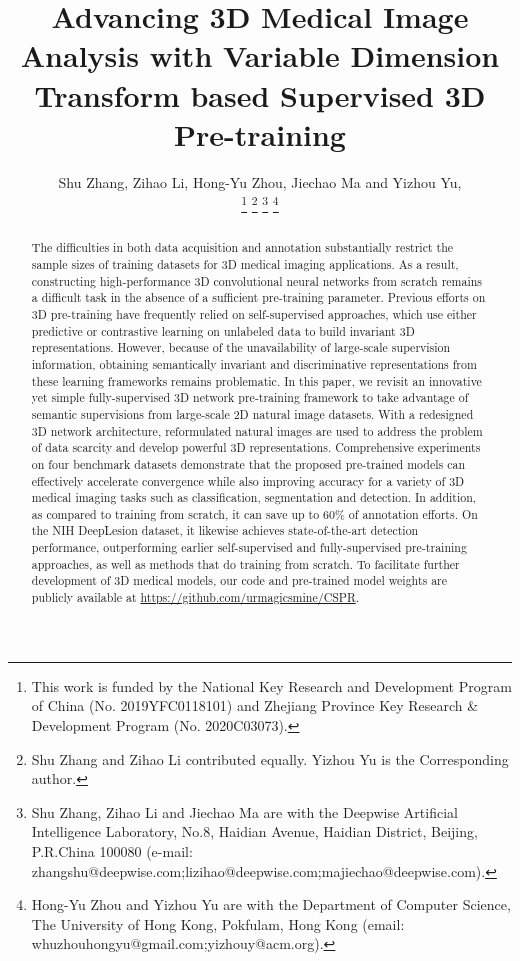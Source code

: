 \documentclass[journal,twoside,web]{ieeecolor}
\begin{document}
\title{Advancing 3D Medical Image Analysis with Variable Dimension Transform based Supervised 3D Pre-training}
\author{Shu Zhang, Zihao Li, Hong-Yu Zhou, Jiechao Ma and Yizhou Yu, \\
\thanks{This work is funded by the National Key Research and Development Program of China (No. 2019YFC0118101) and Zhejiang Province Key Research \& Development Program (No. 2020C03073).}
\thanks{Shu Zhang and Zihao Li contributed equally. Yizhou Yu is the Corresponding author.}
\thanks{Shu Zhang, Zihao Li and Jiechao Ma are with the Deepwise Artificial Intelligence Laboratory, No.8, Haidian Avenue, Haidian District, Beijing, P.R.China 100080 (e-mail: zhangshu@deepwise.com;lizihao@deepwise.com;majiechao@deepwise.com).}
\thanks{Hong-Yu Zhou and Yizhou Yu are with the Department of Computer Science, The University of Hong Kong, Pokfulam, Hong Kong (email: whuzhouhongyu@gmail.com;yizhouy@acm.org).}}


\maketitle

\begin{abstract}
The difficulties in both data acquisition and annotation substantially restrict the sample sizes of training datasets for 3D medical imaging applications. As a result, constructing high-performance 3D convolutional neural networks from scratch remains a difficult task in the absence of a sufficient pre-training parameter. Previous efforts on 3D pre-training have frequently relied on self-supervised approaches, which use either predictive or contrastive learning on unlabeled data to build invariant 3D representations. However, because of the unavailability of large-scale supervision information, obtaining semantically invariant and discriminative representations from these learning frameworks remains problematic. In this paper, we revisit an innovative yet simple fully-supervised 3D network pre-training framework to take advantage of semantic supervisions from large-scale 2D natural image datasets. With a redesigned 3D network architecture, reformulated natural images are used to address the problem of data scarcity and develop powerful 3D representations. Comprehensive experiments on four benchmark datasets demonstrate that the proposed pre-trained models can effectively accelerate convergence while also improving accuracy for a variety of 3D medical imaging tasks such as classification, segmentation and detection. In addition, as compared to training from scratch, it can save up to 60\% of annotation efforts. On the NIH DeepLesion dataset, it likewise achieves state-of-the-art detection performance, outperforming earlier self-supervised and fully-supervised pre-training approaches, as well as methods that do training from scratch. To facilitate further development of 3D medical models, our code and pre-trained model weights are publicly available at \href{https://github.com/urmagicsmine/CSPR}{https://github.com/urmagicsmine/CSPR}.

\end{abstract}
\end{document}
